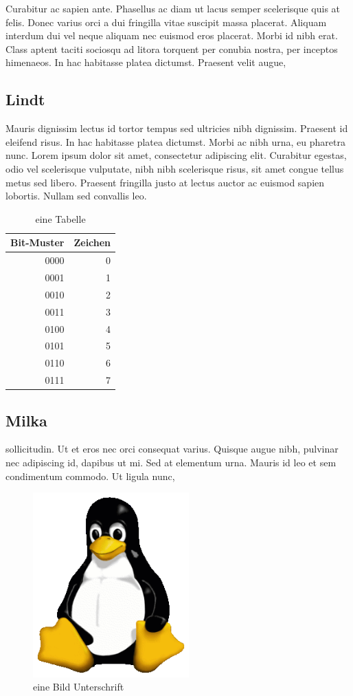 Curabitur ac sapien ante. Phasellus ac diam ut lacus semper scelerisque quis at felis. Donec varius orci a dui fringilla vitae suscipit massa placerat. Aliquam interdum dui vel neque aliquam nec euismod eros placerat. Morbi id nibh erat. Class aptent taciti sociosqu ad litora torquent per conubia nostra, per inceptos himenaeos. In hac habitasse platea dictumst. Praesent velit augue, 
\subsection{Lindt}
Mauris dignissim lectus id tortor tempus sed ultricies nibh dignissim. Praesent id eleifend risus. In hac habitasse platea dictumst. Morbi ac nibh urna, eu pharetra nunc. Lorem ipsum dolor sit amet, consectetur adipiscing elit. Curabitur egestas, odio vel scelerisque vulputate, nibh nibh scelerisque risus, sit amet congue tellus metus sed libero. Praesent fringilla justo at lectus auctor ac euismod sapien lobortis. Nullam sed convallis leo.
\begin{table} \centering
\begin{tabular}{|r|r|}
\hline
Bit-Muster & Zeichen \\
\hline
0000  &  0  \\
\hline
0001  &  1  \\
\hline
0010  &  2  \\
\hline
0011  &  3  \\
\hline
0100  &  4  \\
\hline
0101  &  5  \\
\hline
0110  &  6  \\
\hline
0111  &  7  \\
\hline
\end{tabular}

\caption{eine Tabelle}
\label{tabLindt}
\end{table}

\subsection{Milka}
sollicitudin. Ut et eros \cite{knuth}nec orci consequat varius. Quisque augue nibh, pulvinar nec adipiscing id, dapibus ut mi. Sed at elementum urna. Mauris id leo et sem condimentum commodo. Ut ligula nunc,
\begin{figure} \centering
  \includegraphics[width=6cm]{./img/tux.png}
  \caption{eine Bild Unterschrift}
  \label{tux1}
\end{figure}


